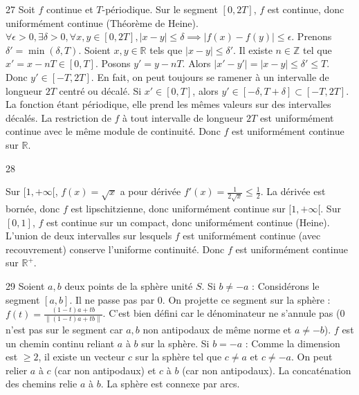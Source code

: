 \begin{correction}{27}
Soit $f$ continue et $T$-périodique.
Sur le segment $[0, 2T]$, $f$ est continue, donc uniformément continue (Théorème de Heine).
$\forall \epsilon > 0, \exists \delta > 0, \forall x,y \in [0, 2T], |x-y| \le \delta \implies |f(x)-f(y)| \le \epsilon$.
Prenons $\delta' = \min(\delta, T)$.
Soient $x, y \in \mathbb{R}$ tels que $|x-y| \le \delta'$.
Il existe $n \in \mathbb{Z}$ tel que $x' = x - nT \in [0, T]$.
Posons $y' = y - nT$. Alors $|x'-y'| = |x-y| \le \delta' \le T$.
Donc $y' \in [-T, 2T]$.
En fait, on peut toujours se ramener à un intervalle de longueur $2T$ centré ou décalé.
Si $x' \in [0, T]$, alors $y' \in [-\delta, T+\delta] \subset [-T, 2T]$.
La fonction étant périodique, elle prend les mêmes valeurs sur des intervalles décalés.
La restriction de $f$ à tout intervalle de longueur $2T$ est uniformément continue avec le même module de continuité.
Donc $f$ est uniformément continue sur $\mathbb{R}$.
\end{correction}

\begin{correction}{28}

Sur $[1, +\infty[$, $f(x) = \sqrt{x}$ a pour dérivée $f'(x) = \frac{1}{2\sqrt{x}} \le \frac{1}{2}$.
La dérivée est bornée, donc $f$ est lipschitzienne, donc uniformément continue sur $[1, +\infty[$.
Sur $[0, 1]$, $f$ est continue sur un compact, donc uniformément continue (Heine).
L'union de deux intervalles sur lesquels $f$ est uniformément continue (avec recouvrement) conserve l'uniforme continuité.
Donc $f$ est uniformément continue sur $\mathbb{R}^{+}$.
\end{correction}

\begin{correction}{29}
Soient $a, b$ deux points de la sphère unité $S$.
Si $b \neq -a$ :
Considérons le segment $[a,b]$. Il ne passe pas par 0.
On projette ce segment sur la sphère : $f(t) = \frac{(1-t)a + tb}{\|(1-t)a + tb\|}$.
C'est bien défini car le dénominateur ne s'annule pas (0 n'est pas sur le segment car $a, b$ non antipodaux de même norme et $a \neq -b$).
$f$ est un chemin continu reliant $a$ à $b$ sur la sphère.
Si $b = -a$ :
Comme la dimension est $\ge 2$, il existe un vecteur $c$ sur la sphère tel que $c \neq a$ et $c \neq -a$.
On peut relier $a$ à $c$ (car non antipodaux) et $c$ à $b$ (car non antipodaux).
La concaténation des chemins relie $a$ à $b$.
La sphère est connexe par arcs.
\end{correction}

